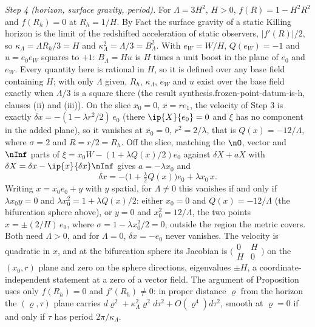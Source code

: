 \emph{Step 4 (horizon, surface gravity, period).} For $\Lambda = 3H^{2}$, $H > 0$, $f(R) = 1 - H^{2}R^{2}$ and $f(R_{h}) = 0$ at $R_{h} = 1/H$. By Fact  the surface gravity of a static Killing horizon is the limit of the redshifted acceleration of static observers, $|f'(R)|/2$, so $\kappa_{\Lambda} = \Lambda R_{h}/3 = H$ and $\kappa_{\Lambda}^{2} = \Lambda/3 = B_{\Lambda}^{2}$. With $e_{W} = W/H$, $Q(e_{W}) = -1$ and $u = e_{0}e_{W}$ squares to $+1$: $B_{\Lambda} = Hu$ is $H$ times a unit boost in the plane of $e_{0}$ and $e_{W}$. Every quantity here is rational in $H$, so it is defined over any base field containing $H$; with only $\Lambda$ given, $R_{h}$, $\kappa_{\Lambda}$, $e_{W}$ and $u$ exist over the base field exactly when $\Lambda/3$ is a square there (the result synthesis.frozen-point-datum-is-h, clauses (ii) and (iii)). On the slice $x_{0} = 0$, $x = re_{1}$, the velocity of Step 3 is exactly $\delta x = -(1 - \lambda r^{2}/2)\,e_{0}$ (there $\ip{X}{e_{0}} = 0$ and $\xi$ has no component in the added plane), so it vanishes at $x_{0} = 0$, $r^{2} = 2/\lambda$, that is $Q(x) = -12/\Lambda$, where $\sigma = 2$ and $R = r/2 = R_{h}$. Off the slice, matching the $\nO$, vector and $\nInf$ parts of $\xi = x_{0}W - (1 + \lambda Q(x)/2)e_{0}$ against $\delta X + aX$ with $\delta X = \delta x - \ip{x}{\delta x}\nInf$ gives $a = -\lambda x_{0}$ and
\[
\delta x = -\bigl(1 + \tfrac{\lambda}{2}Q(x)\bigr)e_{0} + \lambda x_{0}\, x .
\]
Writing $x = x_{0}e_{0} + y$ with $y$ spatial, for $\Lambda \neq 0$ this vanishes if and only if $\lambda x_{0}y = 0$ and $\lambda x_{0}^{2} = 1 + \lambda Q(x)/2$: either $x_{0} = 0$ and $Q(x) = -12/\Lambda$ (the bifurcation sphere above), or $y = 0$ and $x_{0}^{2} = 12/\Lambda$, the two points $x = \pm(2/H)\,e_{0}$, where $\sigma = 1 - \lambda x_{0}^{2}/2 = 0$, outside the region the metric covers. Both need $\Lambda > 0$, and for $\Lambda = 0$, $\delta x = -e_{0}$ never vanishes. The velocity is quadratic in $x$, and at the bifurcation sphere its Jacobian is $\bigl(\begin{smallmatrix} 0 & H \\ H & 0\end{smallmatrix}\bigr)$ on the $(x_{0}, r)$ plane and zero on the sphere directions, eigenvalues $\pm H$, a coordinate-independent statement at a zero of a vector field. The argument of Proposition  uses only $f(R_{h}) = 0$ and $f'(R_{h}) \neq 0$: in proper distance $\varrho$ from the horizon the $(\varrho, \tau)$ plane carries $d\varrho^{2} + \kappa_{\Lambda}^{2}\varrho^{2}d\tau^{2} + O(\varrho^{4})d\tau^{2}$, smooth at $\varrho = 0$ if and only if $\tau$ has period $2\pi/\kappa_{\Lambda}$.

